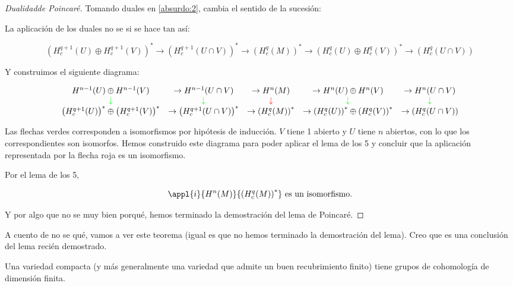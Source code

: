 \documentclass[palatino, bibnumbers]{apuntes}
\begin{document}
\begin{proof}[Dualidad\IS de Poincaré]
Tomando duales en \ref{absurdo:2}, cambia el sentido de la sucesión:

La aplicación de los duales no se si se hace tan así:

\begin{equation}
\label{absurdo:2}
\left(H_c^{q+1}(U) \oplus H_c^{q+1}(V) \right)^{\ast}\to\left(H_c^{q+1}(U\cap V) \right)^{\ast}\to\left(H_c^q(M) \right)^{\ast}\to\left(H_c^{q}(U)\oplus H_c^q(V) \right)^{\ast}\to\left(H_c^q(U\cap V)\right)
\end{equation}



Y construimos el siguiente diagrama:

\begin{equation}
\label{absurdo:4}
\begin{array}{ccccc}
H^{n-1}(U) \oplus H^{n-1}(V) 	&	\to H^{n-1}(U\cap V) 	&	\to H^n(M) 	&	\to H^{n}(U)\oplus H^n(V) 	&	\to H^n(U\cap V)\\
\textcolor{green}{\downarrow} & \textcolor{green}{\downarrow} & \textcolor{red}{\downarrow} & \textcolor{green}{\downarrow} & \textcolor{green}{\downarrow} \\
\left(H_c^{q+1}(U)\right)^{\ast} \oplus \left(H_c^{q+1}(V) \right)^{\ast}	&	\to\left(H_c^{q+1}(U\cap V) \right)^{\ast}	&	\to\left(H_c^q(M) \right)^{\ast}	&	\to\left(H_c^{q}(U)\right)^{\ast}\oplus \left(H_c^q(V) \right)^{\ast}	&	\to\left(H_c^q(U\cap V)\right)
\end{array}
\end{equation}

Las flechas verdes corresponden a isomorfismos por hipótesis de inducción. $V$ tiene 1 abierto y $U$ tiene $n$ abiertos, con lo que los correspondientes son isomorfos. Hemos construido este diagrama para poder aplicar el lema de los 5 y concluir que la aplicación representada por la flecha roja es un isomorfismo.

Por el lema de los 5,

\[
\appl{i}{H^n(M)}{\left(H_c^q(M)\right)^{\ast}} \text{ es un isomorfismo.}
\]

Y por algo que no se muy bien porqué, hemos terminado la demostración del lema de Poincaré.

\end{proof}

A cuento de no se qué, vamos a ver este teorema (igual es que no hemos terminado la demostración del lema). Creo que es una conclusión del lema recién demostrado.

\begin{theorem}
Una variedad compacta (y más generalmente una variedad que admite un buen recubrimiento finito) tiene grupos de cohomología de dimensión finita.
\end{theorem}
\end{document}
